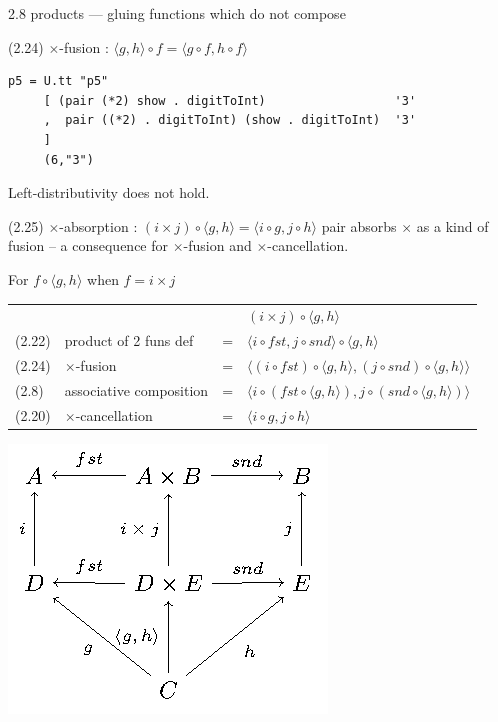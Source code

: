 \documentclass[presentation]{beamer}
\begin{document}
\begin{frame}[fragile,label=sec-7]{2.8 products --- gluing functions which do not compose}
\begin{block}{(2.24) $\times$-fusion : $\langle g,h \rangle \circ f = \langle g \circ f, h \circ f \rangle$}
\begin{verbatim}
p5 = U.tt "p5"
     [ (pair (*2) show . digitToInt)                  '3'
     ,  pair ((*2) . digitToInt) (show . digitToInt)  '3'
     ]
     (6,"3")
\end{verbatim}

Left-distributivity does not hold.
\end{block}

\begin{block}{(2.25) $\times$-absorption : $(i \times j) \circ \langle g,h \rangle = \langle i \circ g,j \circ h \rangle$}
pair absorbs $\times$ as a kind of fusion -- a consequence for $\times$-fusion and $\times$-cancellation.

For $f \circ \langle g,h \rangle$ when $f = i \times j$

\begin{center}
\begin{tabular}{llll}
 &  &  & $(i \times j) \circ \langle g,h \rangle$\\
(2.22) & product of 2 funs def & = & $\langle i \circ fst, j \circ snd \rangle \circ \langle g,h \rangle$\\
(2.24) & $\times$-fusion & = & $\langle (i \circ fst) \circ \langle g, h \rangle,(j \circ snd) \circ \langle g,h \rangle \rangle$\\
(2.8) & associative composition & = & $\langle i \circ (fst \circ \langle g, h \rangle),j \circ (snd \circ \langle g,h \rangle) \rangle$\\
(2.20) & $\times$-cancellation & = & $\langle i \circ g,j \circ h \rangle$\\
\end{tabular}
\end{center}

\includegraphics[width=.9\linewidth]{./product-absorption.png}


\end{block}
\end{frame}
\end{document}
